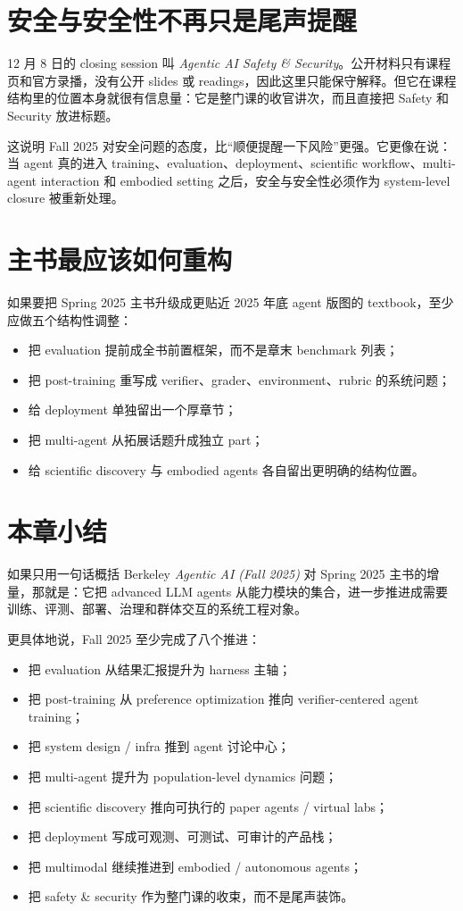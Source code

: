 \section{安全与安全性不再只是尾声提醒}

12 月 8 日的 closing session 叫 \emph{Agentic AI Safety \& Security}。公开材料只有课程页和官方录播，没有公开 slides 或 readings，因此这里只能保守解释。但它在课程结构里的位置本身就很有信息量：它是整门课的收官讲次，而且直接把 Safety 和 Security 放进标题。

这说明 Fall 2025 对安全问题的态度，比“顺便提醒一下风险”更强。它更像在说：当 agent 真的进入 training、evaluation、deployment、scientific workflow、multi-agent interaction 和 embodied setting 之后，安全与安全性必须作为 system-level closure 被重新处理。

\section{主书最应该如何重构}

如果要把 Spring 2025 主书升级成更贴近 2025 年底 agent 版图的 textbook，至少应做五个结构性调整：

\begin{itemize}
\item 把 evaluation 提前成全书前置框架，而不是章末 benchmark 列表；
\item 把 post-training 重写成 verifier、grader、environment、rubric 的系统问题；
\item 给 deployment 单独留出一个厚章节；
\item 把 multi-agent 从拓展话题升成独立 part；
\item 给 scientific discovery 与 embodied agents 各自留出更明确的结构位置。
\end{itemize}

\section{本章小结}

如果只用一句话概括 Berkeley \emph{Agentic AI (Fall 2025)} 对 Spring 2025 主书的增量，那就是：它把 advanced LLM agents 从能力模块的集合，进一步推进成需要训练、评测、部署、治理和群体交互的系统工程对象。

更具体地说，Fall 2025 至少完成了八个推进：

\begin{itemize}
\item 把 evaluation 从结果汇报提升为 harness 主轴；
\item 把 post-training 从 preference optimization 推向 verifier-centered agent training；
\item 把 system design / infra 推到 agent 讨论中心；
\item 把 multi-agent 提升为 population-level dynamics 问题；
\item 把 scientific discovery 推向可执行的 paper agents / virtual labs；
\item 把 deployment 写成可观测、可测试、可审计的产品栈；
\item 把 multimodal 继续推进到 embodied / autonomous agents；
\item 把 safety \& security 作为整门课的收束，而不是尾声装饰。
\end{itemize}

